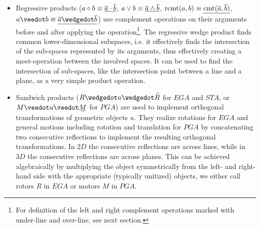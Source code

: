\begin{itemize}
    \item Regressive products ($a \circ b \equiv \underline{\overline{a} \cdot \overline{b}}$, $a
    \vee b \equiv \underline{\overline{a} \wedge \overline{b}}$, $\mathrm{rcmt}(a,b) \equiv
    \underline{\mathrm{cmt}(\overline{a},\overline{b})}$, $a \veedot b \equiv \lcmpl{\rcmpl{a}
    \wedgedot \rcmpl{b}}$) use complement operations on their arguments before and after
    applying the operation\footnote{For definition of the left and right complement
    operations marked with under-line and over-line, see next section.}. The regressive
    wedge product finds common lower-dimensional subspaces, i.e. it effectively finds the
    intersection of the sub-spaces represented by its arguments, thus effectively creating
    a meet-operation between the involved spaces. It can be used to find the intersection
    of sub-spaces, like the intersection point between a line and a plane, as a very
    simple product operation.

    \item Sandwich products ($R \wedgedot u \wedgedot \rev{R}$ for $EGA$ and $STA$, or $M
    \veedot u \veedot \rrev{M}$ for $PGA$) are used to implement orthogonal
    transformations of geometric objects $u$. They realize rotations for $EGA$ and general
    motions including rotation and translation for $PGA$ by concatenating two consecutive
    reflections to implement the resulting orthogonal transformations. In $2D$ the
    consecutive reflections are across lines, while in $3D$ the consecutive reflections
    are across planes. This can be achieved algebraically by multiplying the object
    symmetrically from the left- and right-hand side with the appropriate (typically
    unitized) objects, we either call rotors $R$ in $EGA$ or motors $M$ in $PGA$.
\end{itemize}

